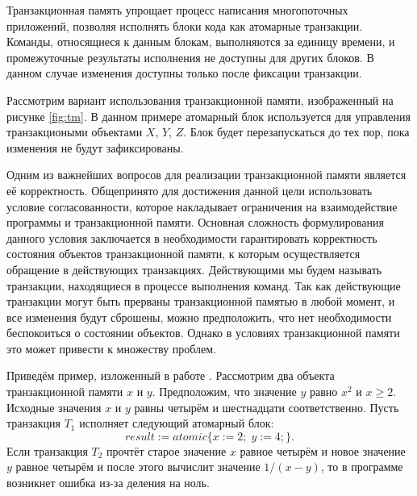 





\Intro
Транзакционная память упрощает процесс написания многопоточных приложений, позволяя исполнять блоки кода как атомарные транзакции. Команды, относящиеся к данным блокам, выполняются за единицу времени, и промежуточные результаты исполнения не доступны для других блоков. В данном случае изменения доступны только после фиксации транзакции. 

Рассмотрим вариант использования транзакционной памяти, изображенный на рисунке \ref{fig:tm}. В данном примере атомарный блок используется для управления транзакциоными объектами $X$, $Y$, $Z$. Блок будет перезапускаться до тех пор, пока изменения не будут зафиксированы.

Одним из важнейших вопросов для реализации транзакционной памяти является её корректность. Общепринято для достижения данной цели использовать условие согласованности, которое накладывает ограничения на взаимодействие программы и транзакционной памяти. Основная сложность формулирования данного условия заключается в необходимости гарантировать корректность состояния объектов транзакционной памяти, к которым осуществляется обращение в действующих транзакциях. Действующими мы будем называть транзакции, находящиеся в процессе выполнения команд. Так как действующие транзакции могут быть прерваны транзакционной памятью в любой момент, и все изменения будут сброшены, можно предположить, что нет необходимости беспокоиться о состоянии объектов. Однако в условиях транзакционной памяти это может привести к множеству проблем.

Приведём пример, изложенный в работе \cite{Guerraoui07opacity:a}. Рассмотрим два объекта транзакционной памяти $x$ и $y$. Предположим, что значение $y$ равно $x^2$ и $x \geq 2$. Исходные значения $x$ и $y$ равны четырём и шестнадцати соответственно. Пусть транзакция $T_1$ исполняет следующий атомарный блок: $$ result := atomic \{ x := 2; \; y := 4; \}.$$ Если транзакция $T_2$ прочтёт старое значение $x$ равное четырём и новое значение $y$ равное четырём и после этого вычислит значение $1 / (x - y)$, то в программе возникнет ошибка из-за деления на ноль.

